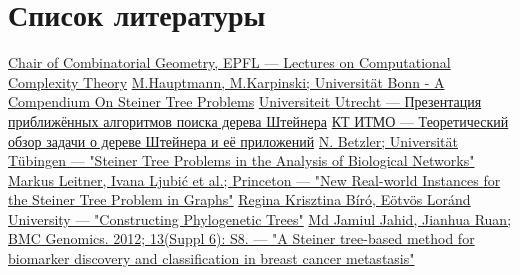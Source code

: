 \documentclass[11pt,a4paper]{report}
\theoremstyle{definition}
\theoremstyle{definition}
\theoremstyle{definition}
\begin{document}
	\section{Список литературы}
	\renewcommand\bibname{}
	\patchcmd{\thebibliography}{\chapter*}{\section*}{}{}
	\vspace*{-1cm}
	\begin{thebibliography}{}
		 \href{https://dcg.epfl.ch/wp-content/uploads/2018/10/9-NPHardness.pdf}{Chair of Combinatorial Geometry, EPFL — Lectures on Computational Complexity Theory}
		 \href{http://theory.cs.uni-bonn.de/info5/steinerkompendium/netcompendium.pdf}{M.Hauptmann, M.Karpinski; Universität Bonn - A Compendium On Steiner Tree Problems}
		 \href{http://www.cs.uu.nl/docs/vakken/an/teoud/an-steiner.ppt}{Universiteit Utrecht — Презентация приближённых алгоритмов поиска дерева Штейнера}
		\href{http://rain.ifmo.ru/cat/data/theory/unsorted/steiner-problem-2010/article.pdf}{КТ ИТМО — Теоретический обзор задачи о дереве Штейнера и её приложений}
		 \href{https://fpt.akt.tu-berlin.de/publications/steiner-tree-betzler06.pdf}{N. Betzler; Universität Tübingen — "Steiner Tree Problems in the Analysis of Biological Networks"}
		 \href{https://homepage.univie.ac.at/ivana.ljubic/research/STP/realworld-stp-report-short.pdf}{Markus Leitner, Ivana Ljubić et al.; Princeton — "New Real-world Instances for the Steiner Tree Problem in Graphs"}
		 \href{http://web.cs.elte.hu/~berkri/Theses/Biro.pdf }{Regina Krisztina Bíró, Eötvös Loránd University — "Constructing Phylogenetic Trees"}
		 \href{https://www.ncbi.nlm.nih.gov/pmc/articles/PMC3481447/}{Md Jamiul Jahid, Jianhua Ruan; BMC Genomics. 2012; 13(Suppl 6): S8. — "A Steiner tree-based method for biomarker discovery and classification in breast cancer metastasis"}
	\end{thebibliography}
\end{document}
